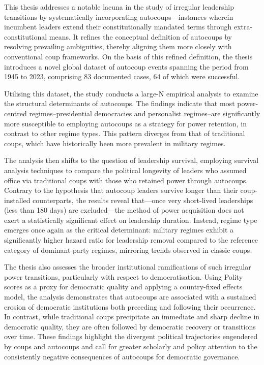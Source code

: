 \documentclass[
  12pt,
]{report}
\begin{document}
This thesis addresses a notable lacuna in the study of irregular
leadership transitions by systematically incorporating
autocoups---instances wherein incumbent leaders extend their
constitutionally mandated terms through extra-constitutional means. It
refines the conceptual definition of autocoups by resolving prevailing
ambiguities, thereby aligning them more closely with conventional coup
frameworks. On the basis of this refined definition, the thesis
introduces a novel global dataset of autocoup events spanning the period
from 1945 to 2023, comprising 83 documented cases, 64 of which were
successful.

Utilising this dataset, the study conducts a large-N empirical analysis
to examine the structural determinants of autocoups. The findings
indicate that most power-centred regimes--presidential democracies and
personalist regimes--are significantly more susceptible to employing
autocoups as a strategy for power retention, in contrast to other regime
types. This pattern diverges from that of traditional coups, which have
historically been more prevalent in military regimes.

The analysis then shifts to the question of leadership survival,
employing survival analysis techniques to compare the political
longevity of leaders who assumed office via traditional coups with those
who retained power through autocoups. Contrary to the hypothesis that
autocoup leaders survive longer than their coup-installed counterparts,
the results reveal that---once very short-lived leaderships (less than
180 days) are excluded---the method of power acquisition does not exert
a statistically significant effect on leadership duration. Instead,
regime type emerges once again as the critical determinant: military
regimes exhibit a significantly higher hazard ratio for leadership
removal compared to the reference category of dominant-party regimes,
mirroring trends observed in classic coups.

The thesis also assesses the broader institutional ramifications of such
irregular power transitions, particularly with respect to
democratisation. Using Polity scores as a proxy for democratic quality
and applying a country-fixed effects model, the analysis demonstrates
that autocoups are associated with a sustained erosion of democratic
institutions both preceding and following their occurrence. In contrast,
while traditional coups precipitate an immediate and sharp decline in
democratic quality, they are often followed by democratic recovery or
transitions over time. These findings highlight the divergent political
trajectories engendered by coups and autocoups and call for greater
scholarly and policy attention to the consistently negative consequences
of autocoups for democratic governance.
\end{document}

